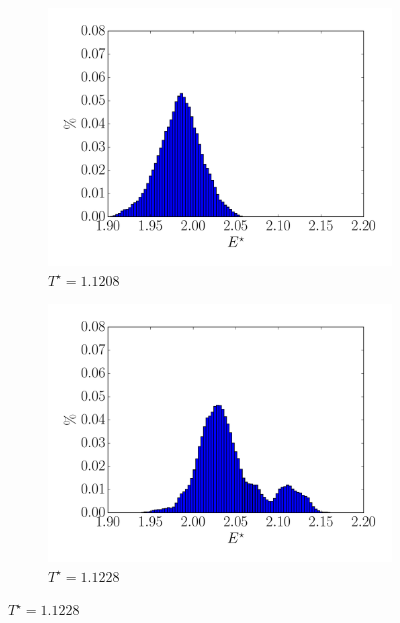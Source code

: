 \documentclass[11pt]{article}
\numberwithin{equation}{section}
\begin{document}
\begin{figure}
\center
    \begin{subfigure}[b]{0.49\textwidth}
    	\center
    	\includegraphics[scale=0.4]{figures/histo_11208.pdf}
    	\caption{$T^\star =1.1208$}
    	\label{11208}
    \end{subfigure}	
	\begin{subfigure}[b]{0.49\textwidth}
    	\center
    	\includegraphics[scale=0.4]{figures/histo_11228.pdf}
    	\caption{$T^\star =1.1228$}
    	\label{11228}
    \end{subfigure}
    

\end{figure}
\end{document}
